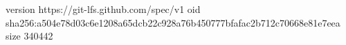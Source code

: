 version https://git-lfs.github.com/spec/v1
oid sha256:a504e78d03c6e1208a65dcb22c928a76b450777bfafac2b712c70668e81e7eea
size 340442
